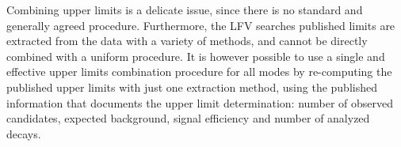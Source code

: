 \label{sec:tau:lfv-comb}
\newcommand{\cls}{\ensuremath{\text{CL}_s}\xspace}
\newcommand{\clsb}{\ensuremath{\text{CL}_{s+b}}\xspace}
\newcommand{\clb}{\ensuremath{\text{CL}_b}\xspace}

Combining upper limits is a delicate issue, since there is no standard and
generally agreed procedure. Furthermore, the \mtau LFV searches
published limits are extracted from the data with a variety of
methods, and cannot be directly combined with a uniform procedure. It
is however possible to use a single and effective
upper limits combination procedure for all modes by re-computing the published upper
limits with just one extraction method, using the published
information that documents the upper limit determination:
number of observed candidates, expected background, signal efficiency and
number of analyzed \mtau decays.

